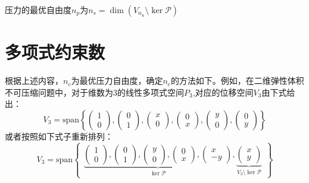 压力的最优自由度$n_p$为$n_s = \dim(V_{n_u}\setminus \ker \mathcal P)$

\section{多项式约束数}

根据上述内容，$n_c$为最优压力自由度，确定$n_c$的方法如下。例如，在二维弹性体积不可压缩问题中，对于维数为3的线性多项式空间$P_3$,对应的位移空间$V_3$由下式给出：
\begin{equation}
    V_3 = \mathrm{span} \left \{
    \begin{pmatrix} 1 \\ 0 \end{pmatrix},
    \begin{pmatrix} 0 \\ 1 \end{pmatrix},
    \begin{pmatrix} x \\ 0 \end{pmatrix},
    \begin{pmatrix} 0 \\ x \end{pmatrix},
    \begin{pmatrix} y \\ 0 \end{pmatrix},
    \begin{pmatrix} 0 \\ y \end{pmatrix}
    \right \}
\end{equation}
或者按照如下式子重新排列：
\begin{equation}\label{base1}
    V_3 = \mathrm{span} 
    \begin{Bmatrix}
        \underbrace{
        \begin{pmatrix} 1 \\ 0 \end{pmatrix},
        \begin{pmatrix} 0 \\ 1 \end{pmatrix},
        \begin{pmatrix} y \\ 0 \end{pmatrix},
        \begin{pmatrix} 0 \\ x \end{pmatrix},
        \begin{pmatrix} x \\ -y \end{pmatrix}
        }_{\ker \mathcal P},
        \underbrace{
        \begin{pmatrix} x \\ y \end{pmatrix}
        }_{V_3\setminus \ker \mathcal P}
    \end{Bmatrix}
\end{equation}
